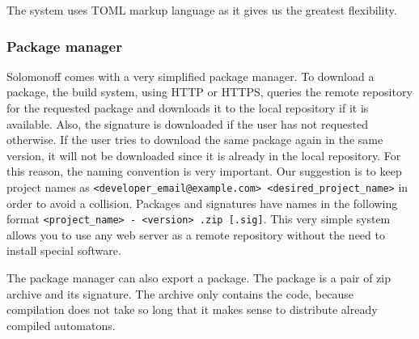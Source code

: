 The system uses TOML markup language as it gives us the greatest
flexibility.

\hypertarget{package-manager}{%
\subsubsection{Package manager}\label{package-manager}}

Solomonoff comes with a very simplified package manager. To download a
package, the build system, using HTTP or HTTPS, queries the remote
repository for the requested package and downloads it to the local
repository if it is available. Also, the signature is downloaded if the
user has not requested otherwise. If the user tries to download the same
package again in the same version, it will not be downloaded since it is
already in the local repository. For this reason, the naming convention
is very important. Our suggestion is to keep project names as
\texttt{\textless{}developer\_email@example.com\textgreater{}\ \textless{}desired\_project\_name\textgreater{}}
in order to avoid a collision. Packages and signatures have names in the
following format
\texttt{\textless{}project\_name\textgreater{}\ -\ \textless{}version\textgreater{}\ .zip\ {[}.sig{]}}.
This very simple system allows you to use any web server as a remote
repository without the need to install special software. 

The package manager can also export a package. The package is a pair of zip archive
and its signature. The archive only contains the code, because
compilation does not take so long that it makes sense to distribute
already compiled automatons.
